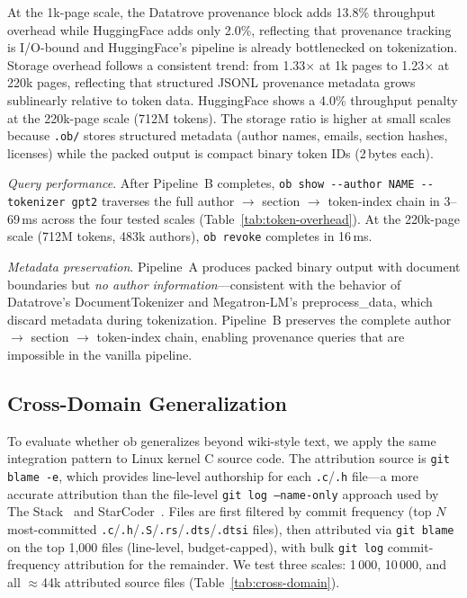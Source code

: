 

At the 1k-page scale, the Datatrove provenance block adds 13.8\% throughput overhead while HuggingFace adds only 2.0\%, reflecting that provenance tracking is I/O-bound and HuggingFace's pipeline is already bottlenecked on tokenization. Storage overhead follows a consistent trend: from 1.33$\times$ at 1k pages to 1.23$\times$ at 220k pages, reflecting that structured JSONL provenance metadata grows sublinearly relative to token data. HuggingFace shows a 4.0\% throughput penalty at the 220k-page scale (712M tokens). The storage ratio is higher at small scales because \texttt{.ob/} stores structured metadata (author names, emails, section hashes, licenses) while the packed output is compact binary token IDs (2\,bytes each).

\emph{Query performance}. After Pipeline~B completes, \texttt{ob show -{}-author NAME -{}-tokenizer gpt2} traverses the full author $\rightarrow$ section $\rightarrow$ token-index chain in 3--69\,ms across the four tested scales (Table~\ref{tab:token-overhead}). At the 220k-page scale (712M tokens, 483k authors), \texttt{ob revoke} completes in 16\,ms.

\emph{Metadata preservation}. Pipeline~A produces packed binary output with document boundaries but \emph{no author information}---consistent with the behavior of Datatrove's DocumentTokenizer and Megatron-LM's preprocess\_data, which discard metadata during tokenization. Pipeline~B preserves the complete author $\rightarrow$ section $\rightarrow$ token-index chain, enabling provenance queries that are impossible in the vanilla pipeline.

\subsection{Cross-Domain Generalization}
\label{sec:cross-domain}

To evaluate whether ob generalizes beyond wiki-style text, we apply the same integration pattern to Linux kernel C source code. The attribution source is \texttt{git blame -e}, which provides line-level authorship for each \texttt{.c}/\texttt{.h} file---a more accurate attribution than the file-level \texttt{git log --name-only} approach used by The Stack~\cite{kocetkov2022thestack} and StarCoder~\cite{li2023starcoder}. Files are first filtered by commit frequency (top $N$ most-committed \texttt{.c}/\texttt{.h}/\texttt{.S}/\texttt{.rs}/\texttt{.dts}/\texttt{.dtsi} files), then attributed via \texttt{git blame} on the top 1,000 files (line-level, budget-capped), with bulk \texttt{git log} commit-frequency attribution for the remainder. We test three scales: 1\,000, 10\,000, and all $\approx$44k attributed source files (Table~\ref{tab:cross-domain}).

